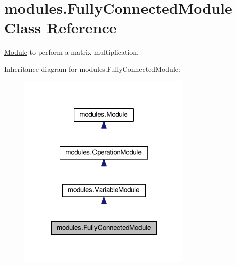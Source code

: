 \hypertarget{classmodules_1_1_fully_connected_module}{}\section{modules.\+Fully\+Connected\+Module Class Reference}
\label{classmodules_1_1_fully_connected_module}


\hyperlink{classmodules_1_1_module}{Module} to perform a matrix multiplication.  




Inheritance diagram for modules.\+Fully\+Connected\+Module\+:\nopagebreak
\begin{figure}[H]
\begin{center}
\leavevmode
\includegraphics[width=236pt]{classmodules_1_1_fully_connected_module__inherit__graph}
\end{center}
\end{figure}
